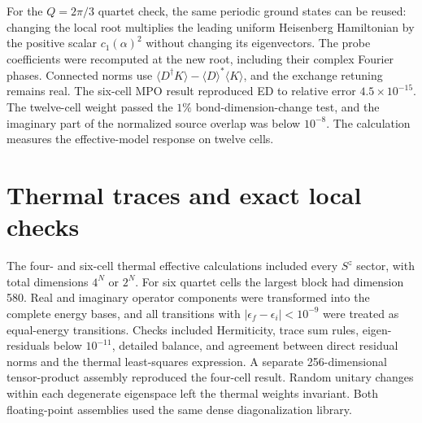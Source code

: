 For the $Q=2\pi/3$ quartet check, the same periodic ground states can be
reused: changing the local root multiplies the leading uniform Heisenberg
Hamiltonian by the positive scalar $c_1(\alpha)^2$ without changing its
eigenvectors. The probe coefficients were recomputed at the new root,
including their complex Fourier phases. Connected norms use
$\langle D^\dagger K\rangle-\langle D\rangle^*\langle K\rangle$,
and the exchange retuning remains real. The six-cell MPO result reproduced
ED to relative error $4.5\times10^{-15}$. The twelve-cell weight passed the
$1\%$ bond-dimension-change test, and the imaginary part of the normalized
source overlap was below $10^{-8}$. The calculation measures the
effective-model response on twelve cells.

\section{Thermal traces and exact local checks}
\label{app:exact-local-check}

The four- and six-cell thermal effective calculations included every
$S^z$ sector, with total dimensions $4^N$ or $2^N$. For six quartet
cells the largest block had dimension 580. Real and imaginary operator
components were transformed into the complete energy bases, and all
transitions with $|\epsilon_f-\epsilon_i|<10^{-9}$ were treated as
equal-energy transitions. Checks included Hermiticity, trace sum rules,
eigen-residuals below $10^{-11}$, detailed balance, and agreement between
direct residual norms and the thermal least-squares expression. A separate
256-dimensional tensor-product assembly reproduced the four-cell result.
Random unitary changes within each degenerate eigenspace left the thermal
weights invariant. Both floating-point assemblies used the same dense
diagonalization library.

